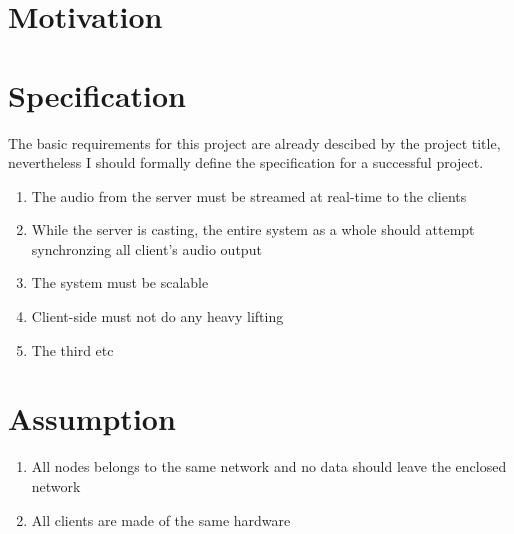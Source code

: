 \section{Motivation}






\section{Specification}

The basic requirements for this project are already descibed by the project title, nevertheless I should formally define the specification for a successful project.\\

\begin{enumerate}  
\item The audio from the server must be streamed at real-time to the clients
\item While the server is casting, the entire system as a whole should attempt synchronzing all client's audio output

\item The system must be scalable 
\item Client-side must not do any heavy lifting
\item The third etc
\end{enumerate}


\section{Assumption}

\begin{enumerate}  
\item All nodes belongs to the same network and no data should leave the enclosed network

\item All clients are made of the same hardware

\end{enumerate}
